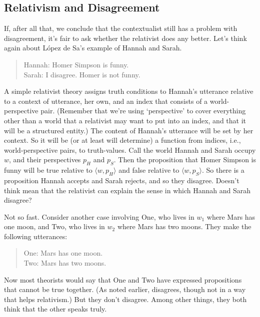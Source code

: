 \subsection{Relativism and Disagreement}
\label{relativismanddisagreement}

If, after all that, we conclude that the contextualist still has a problem with disagreement, it's fair to ask whether the relativist does any better. Let's think again about López de Sa's example of Hannah and Sarah.

\begin{quote}

Hannah: Homer Simpson is funny.\\
Sarah: I disagree. Homer is not funny.
\end{quote}
A simple relativist theory assigns truth conditions to Hannah's utterance relative to a context of utterance, her own, and an index that consists of a world-perspective pair. (Remember that we're using `perspective' to cover everything other than a world that a relativist may want to put into an index, and that it will be a structured entity.) The content of Hannah's utterance will be set by her context. So it will be (or at least will determine) a function from indices, i.e., world-perspective pairs, to truth-values. Call the world Hannah and Sarah occupy $w$, and their perspectives $p_H$ and $p_S$. Then the proposition that Homer Simpson is funny will be true relative to $\langle w, p_H\rangle$ and false relative to $\langle w, p_S\rangle$. So there is a proposition Hannah accepts and Sarah rejects, and so they disagree. Doesn't think mean that the relativist can explain the sense in which Hannah and Sarah disagree?

Not so fast. Consider another case involving One, who lives in $w_1$ where Mars has one moon, and Two, who lives in $w_2$ where Mars has two moons. They make the following utterances:

\begin{quote}

One: Mars has one moon.\\
Two: Mars has two moons.
\end{quote}
Now most theorists would say that One and Two have expressed propositions that cannot be true together. (As noted earlier,  \citet{Schaffer2012} disagrees, though not in a way that helps relativism.) But they don't disagree. Among other things, they both think that the other speaks truly.

